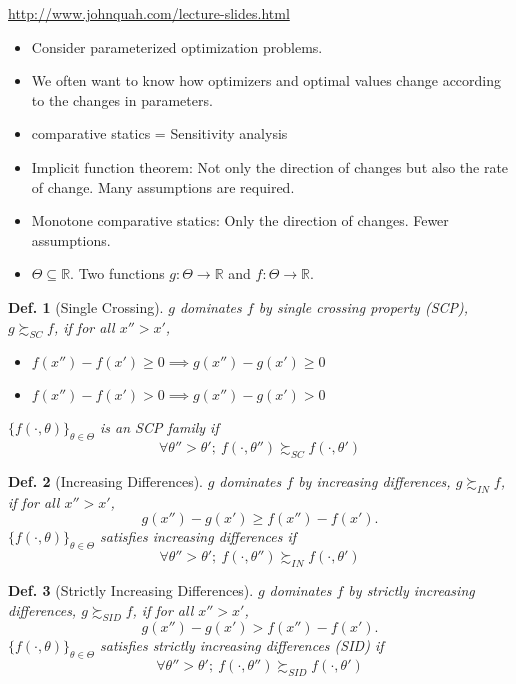 \documentclass[11pt,a4paper,dvipdfmx]{article}
\theoremstyle{plain}
\newtheorem{df}{Def.}[section]
\newcommand{\R}{\mathbb{R}}
\newcommand{\1}{\mathbbm{1}}
\begin{document}
\url{http://www.johnquah.com/lecture-slides.html}

\begin{itemize}
	\item Consider parameterized optimization problems.
	\item We often want to know how optimizers and optimal values change according to the changes in parameters.
	\item comparative statics = Sensitivity analysis
	\item Implicit function theorem: Not only the direction of changes but also the rate of change. Many assumptions are required.
	\item Monotone comparative statics: Only the direction of changes. Fewer assumptions.
	\item $\Theta \subseteq \R$. Two functions $g: \Theta \to \R$ and $f: \Theta \to \R$.
\end{itemize}

\begin{df}[Single Crossing]
	$g$ dominates $f$ by single crossing property (SCP), $g \succsim_{SC} f$, if for all $x'' > x'$,
	\begin{itemize}
		\item $f(x'') - f(x') \geq 0 \implies g(x'') - g(x') \geq 0$
		\item $f(x'') - f(x') > 0 \implies g(x'') - g(x') > 0$
	\end{itemize}
	
	$\{f(\cdot, \theta)\}_{\theta \in \Theta}$ is an SCP family if
	$$
	\forall \theta'' > \theta' ; \ f(\cdot, \theta'') \succsim_{SC} f(\cdot, \theta')
	$$
\end{df}

\begin{df}[Increasing Differences]
	$g$ dominates $f$ by increasing differences, $g \succsim_{IN} f$, if for all $x'' > x'$, $$g(x'') - g(x') \geq f(x'') - f(x').$$
	$\{f(\cdot, \theta)\}_{\theta \in \Theta}$ satisfies increasing differences if
	$$
	\forall \theta'' > \theta' ; \ f(\cdot, \theta'') \succsim_{IN} f(\cdot, \theta')
	$$
\end{df}
\begin{df}[Strictly Increasing Differences]
	$g$ dominates $f$ by strictly increasing differences, $g \succsim_{SID} f$, if for all $x'' > x'$, $$g(x'') - g(x') > f(x'') - f(x').$$
	$\{f(\cdot, \theta)\}_{\theta \in \Theta}$ satisfies strictly increasing differences (SID) if
	$$
	\forall \theta'' > \theta' ; \ f(\cdot, \theta'') \succsim_{SID} f(\cdot, \theta')
	$$
\end{df}
\end{document}
